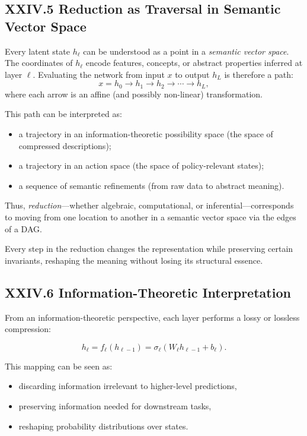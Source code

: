 \documentclass[11pt,letterpaper]{article}
\begin{document}
\subsection{XXIV.5 Reduction as Traversal in Semantic Vector Space}

Every latent state $h_\ell$ can be understood as a point in a \emph{semantic vector space}. The coordinates of $h_\ell$ encode features, concepts, or abstract properties inferred at layer $\ell$. Evaluating the network from input $x$ to output $h_L$ is therefore a path:
\[
x = h_0 \to h_1 \to h_2 \to \cdots \to h_L,
\]
where each arrow is an affine (and possibly non-linear) transformation.

This path can be interpreted as:

\begin{itemize}
    \item a trajectory in an information-theoretic possibility space (the space of compressed descriptions);
    \item a trajectory in an action space (the space of policy-relevant states);
    \item a sequence of semantic refinements (from raw data to abstract meaning).
\end{itemize}

Thus, \emph{reduction}—whether algebraic, computational, or inferential—corresponds to moving from one location to another in a semantic vector space via the edges of a DAG.

Every step in the reduction changes the representation while preserving certain invariants, reshaping the meaning without losing its structural essence.

\subsection{XXIV.6 Information-Theoretic Interpretation}

From an information-theoretic perspective, each layer performs a lossy or lossless compression:

\[
h_\ell = f_\ell(h_{\ell-1}) = \sigma_\ell(W_\ell h_{\ell-1} + b_\ell).
\]

This mapping can be seen as:

\begin{itemize}
    \item discarding information irrelevant to higher-level predictions,
    \item preserving information needed for downstream tasks,
    \item reshaping probability distributions over states.
\end{itemize}
\end{document}
